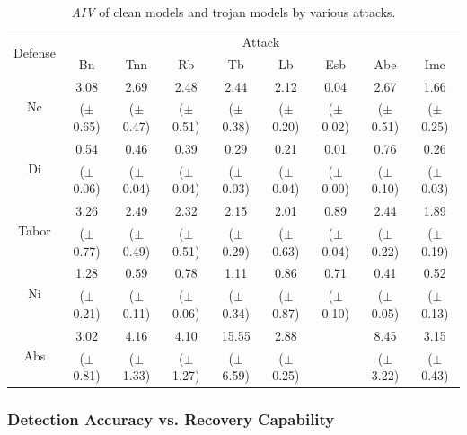 \documentclass[compsoc,conference,a4paper,10pt,times]{IEEEtran}
\newcommand{\bn}{{\sc Bn}\xspace}
\newcommand{\tnn}{{\sc Tnn}\xspace}
\newcommand{\tb}{{\sc Tb}\xspace}
\newcommand{\lb}{{\sc Lb}\xspace}
\newcommand{\esb}{{\sc Esb}\xspace}
\newcommand{\rfb}{{\sc Rb}\xspace}
\newcommand{\abe}{{\sc Abe}\xspace}
\newcommand{\imc}{{\sc Imc}\xspace}
\newcommand{\anidx}{{\em \small AIV}\xspace}
\newcommand{\nc}{{\sc Nc}\xspace}
\newcommand{\ninspect}{{\sc Ni}\xspace}
\newcommand{\abs}{{\sc Abs}\xspace}
\newcommand{\tabor}{{\sc Tabor}\xspace}
\newcommand{\di}{{\sc Di}\xspace}
\begin{document}
\begin{table}[!ht]{\footnotesize
    \centering
    \renewcommand{\arraystretch}{1.2}
    \setlength{\tabcolsep}{0.3pt}
    \begin{tabular}{c|c|c|c|c|c|c|c|c}
            \multirow{2}{*}{Defense} & \multicolumn{8}{c}{Attack} \\
        \cline{2-9}
    & \bn & \tnn & \rfb & \tb & \lb & \esb & \abe & \imc\\
    \hline
    \hline
    \multirow{2}{*}{\nc} & 3.08 & 2.69 & 2.48 & 2.44 &2.12 & 0.04 & 2.67 & 1.66 \\
        & ($\pm$0.65) & ($\pm$0.47) & ($\pm$0.51) & ($\pm$0.38) & ($\pm$0.20) & ($\pm$0.02) & ($\pm$0.51) & ($\pm$0.25)\\
    \hline
    \multirow{2}{*}{\di} & 0.54 & 0.46 & 0.39 & 0.29 & 0.21 & 0.01 & 0.76 & 0.26 \\
        & ($\pm$0.06) & ($\pm$0.04) & ($\pm$0.04) & ($\pm$0.03) & ($\pm$0.04) & ($\pm$0.00) & ($\pm$0.10) & ($\pm$0.03)\\
    \hline
    \multirow{2}{*}{\tabor} & \cellcolor{Red}3.26 & 2.49 & 2.32 & 2.15 & 2.01 & 0.89 & 2.44 & 1.89 \\
        & ($\pm$0.77) & ($\pm$0.49) & ($\pm$0.51) & ($\pm$0.29) & ($\pm$0.63) & ($\pm$0.04) & ($\pm$0.22) & ($\pm$0.19)\\
    \hline
    \multirow{2}{*}{\ninspect} & 1.28 & 0.59 & 0.78 & 1.11 & 0.86 & 0.71 & 0.41 & 0.52 \\
        & ($\pm$0.21) & ($\pm$0.11) & ($\pm$0.06) & ($\pm$0.34) & ($\pm$0.87) & ($\pm$0.10) & ($\pm$0.05) & ($\pm$0.13)\\
    \hline
    \multirow{2}{*}{\abs} & 3.02 & \cellcolor{Red}4.16 & \cellcolor{Red}4.10 &  \cellcolor{Red}15.55 &  \cellcolor{Red}2.88 & \cellcolor{Gray} & \cellcolor{Red}8.45 & \cellcolor{Red}3.15 \\
        & ($\pm$0.81) & ($\pm$1.33) & ($\pm$1.27) & ($\pm$6.59) & ($\pm$0.25) & \cellcolor{Gray} & ($\pm$3.22) & ($\pm$0.43)\\
    \hline
    \end{tabular}
    \caption{\footnotesize \anidx of clean models and trojan models by various attacks. \label{tab:anidx}}}
\end{table}


\subsubsection{Detection Accuracy vs. Recovery Capability}
\end{document}
